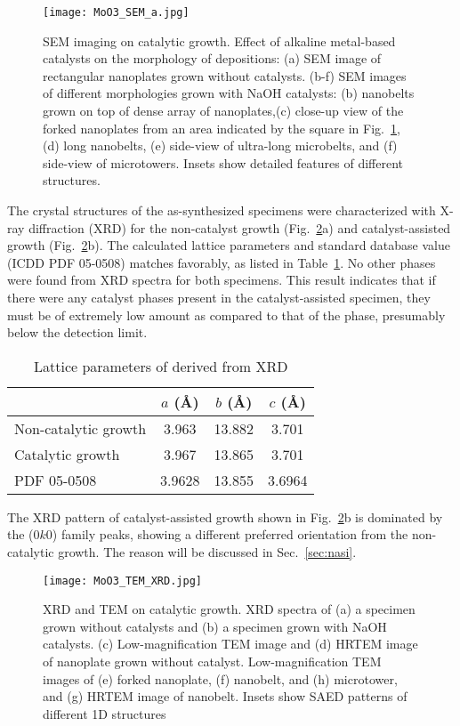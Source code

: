 \begin{figure}[htb]
\centering
\texttt{[image: MoO3\_SEM\_a.jpg]}
\caption[SEM imaging on  catalytic growth]{SEM imaging on  catalytic growth. Effect of alkaline metal-based catalysts on the morphology of  depositions: (a) SEM image of rectangular nanoplates grown without catalysts. (b-f) SEM images of different morphologies grown with NaOH catalysts: (b) nanobelts grown on top of dense array of nanoplates,(c) close-up view of the forked nanoplates from an area indicated by the square in Fig.~\ref{fig:ch4sem2by3}, (d) long nanobelts, (e) side-view of ultra-long microbelts, and (f) side-view of microtowers. Insets show detailed features of different  structures.}
\label{fig:ch4sem2by3}
\end{figure}

The crystal structures of the as-synthesized specimens were characterized with X-ray diffraction (XRD) for the non-catalyst growth (Fig.~\ref{fig:ch4tem3by3}a) and catalyst-assisted growth (Fig.~\ref{fig:ch4tem3by3}b). The calculated lattice parameters and standard database value (ICDD PDF 05-0508) matches favorably, as listed in Table~\ref{tab:ch4xrd}. No other phases were found from XRD spectra for both specimens. This result indicates that if there were any catalyst phases present in the catalyst-assisted specimen, they must be of extremely low amount as compared to that of the  phase, presumably below the detection limit. 
\begin{table}[htb]
\centering
\caption{Lattice parameters of  derived from XRD}\label{tab:ch4xrd}
\begin{tabular}{lccc}
\toprule
           & $a$ (\AA) & $b$ (\AA) & $c$ (\AA)   \\
\midrule
Non-catalytic growth  & 3.963    & 13.882 & 3.701  \\
Catalytic growth  & 3.967    & 13.865 & 3.701  \\
PDF 05-0508       & 3.9628    & 13.855 & 3.6964  \\
\bottomrule
\end{tabular}
\end{table}

The XRD pattern of catalyst-assisted growth shown in Fig.~\ref{fig:ch4tem3by3}b is dominated by the (0$k$0) family peaks, showing a different preferred orientation from the non-catalytic growth. The reason will be discussed in Sec.~\ref{sec:nasi}. 

\begin{figure}[htb]
\centering
\texttt{[image: MoO3\_TEM\_XRD.jpg]}
\caption[XRD and TEM on  catalytic growth]{XRD and TEM on  catalytic growth. XRD spectra of (a) a specimen grown without catalysts and (b) a specimen grown with NaOH catalysts. (c) Low-magnification TEM image and (d) HRTEM image of nanoplate grown without catalyst. Low-magnification TEM images of (e) forked nanoplate, (f) nanobelt, and (h) microtower, and (g) HRTEM image of nanobelt. Insets show SAED patterns of different  1D structures}
\label{fig:ch4tem3by3}
\end{figure}

